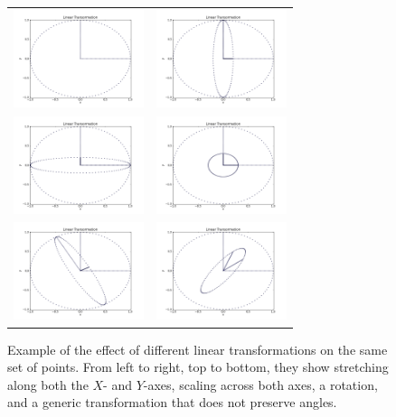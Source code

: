 \documentclass[justified,sixbynine]{tufte-book}
\theoremstyle{plain}%
\theoremstyle{definition}
\theoremstyle{remark}
\begin{document}
\begin{fullwidth}
\begin{figure}[ht]
\centering
\begin{tabular}{cc}
\includegraphics[width=1.5in]{images/la1.png} &
\includegraphics[width=1.5in]{images/la2.png} \\
\includegraphics[width=1.5in]{images/la3.png} &
\includegraphics[width=1.5in]{images/la4.png} \\
\includegraphics[width=1.5in]{images/la5.png} &
\includegraphics[width=1.5in]{images/la6.png}
\end{tabular}
\caption{Example of the effect of different linear transformations on the same set of points. From left to right, top to bottom, they show stretching along both the $X$- and $Y$-axes, scaling across both axes, a rotation, and a generic transformation that does not preserve angles.}
\end{figure}


\end{fullwidth}
\end{document}
